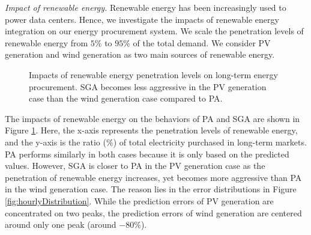 \emph{Impact of renewable energy.} Renewable energy has been increasingly used to power data centers. Hence, we investigate the impacts of renewable energy integration on our energy procurement system. We scale the penetration levels of renewable energy from $5\%$ to $95\%$ of the total demand. We consider PV generation and wind generation as two main sources of renewable energy.

\begin{figure}[!ht]    
	\centering
	\vspace{-0.3cm}
	\vspace{-0.2cm}
	\caption{Impacts of renewable energy penetration levels on long-term energy procurement. SGA becomes less aggressive in the PV generation case than the wind generation case compared to PA.}
	\label{fig:renewableImpactLTEnergy}
\end{figure}

The impacts of renewable energy on the behaviors of PA and SGA are shown in Figure \ref{fig:renewableImpactLTEnergy}. Here, the x-axis represents the penetration levels of renewable energy, and the y-axis is the ratio (\%) of total electricity purchased in long-term markets. PA performs similarly in both cases because it is only based on the predicted values. However, SGA is closer to PA in the PV generation case as the penetration of renewable energy increases, yet becomes more aggressive than PA in the wind generation case. The reason lies in the error distributions in Figure \ref{fig:hourlyDistribution}. While the prediction errors of PV generation are concentrated on two peaks, the prediction errors of wind generation are centered around only one peak (around $-80\%$). 

